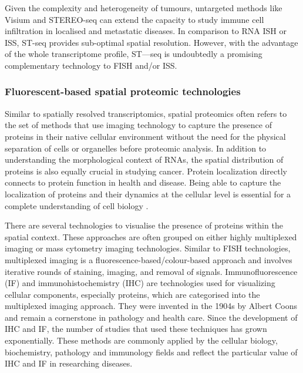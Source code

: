 Given the complexity and heterogeneity of tumours, untargeted methods like Visium and STEREO-seq can extend the capacity to study immune cell infiltration in localised and metastatic diseases. In comparison to RNA ISH or ISS, ST-seq provides sub-optimal spatial resolution. However, with the advantage of the whole transcriptome profile, ST—seq is undoubtedly a promising complementary technology to FISH and/or ISS.  

\subsubsection{Fluorescent-based spatial proteomic technologies}
Similar to spatially resolved transcriptomics, spatial proteomics often refers to the set of methods that use imaging technology to capture the presence of proteins in their native cellular environment without the need for the physical separation of cells or organelles before proteomic analysis. In addition to understanding the morphological context of RNAs, the spatial distribution of proteins is also equally crucial in studying cancer. Protein localization directly connects to protein function in health and disease. Being able to capture the localization of proteins and their dynamics at the cellular level is essential for a complete understanding of cell biology \cite{lundberg2019spatial}. 

There are several technologies to visualise the presence of proteins within the spatial context. These approaches are often grouped on either highly multiplexed imaging or mass cytometry imaging technologies. Similar to FISH technologies, multiplexed imaging is a fluorescence-based/colour-based approach and involves iterative rounds of staining, imaging, and removal of signals. Immunofluorescence (IF) and immunohistochemistry (IHC) are technologies used for visualizing cellular components, especially proteins, which are categorised into the multiplexed imaging approach. They were invented in the 1904s by Albert Coons \cite{coons1941immunological} and remain a cornerstone in pathology and health care. Since the development of IHC and IF, the number of studies that used these techniques has grown exponentially. These methods are commonly applied by the cellular biology, biochemistry, pathology and immunology fields and reflect the particular value of IHC and IF in researching diseases.        

